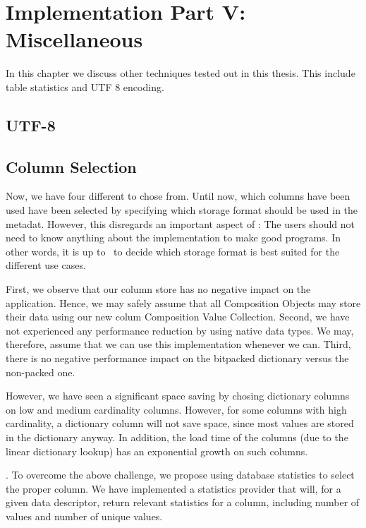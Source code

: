 \chapter{Implementation Part V: Miscellaneous}
\label{chp:misc}
In this chapter we discuss other techniques tested out in this thesis. This include table statistics and UTF 8 encoding.

\section{UTF-8}
\label{sec:UTF-8}


\section{Column Selection}
\label{sec:Column Selection}
Now, we have four different  to chose from. Until now, which columns have been used have been selected by specifying which storage format should be used in the metadat. However, this disregards an important aspect of \mdd: The users should not need to know anything about the implementation to make good programs. In other words, it is up to \gap~to decide which storage format is best suited for the different use cases.

First, we observe that our column store has no negative impact on the application. Hence, we may safely assume that all Composition Objects may store their data using our new colum Composition Value Collection. Second, we have not experienced any performance reduction by using native data types. We may, therefore, assume that we can use this implementation whenever we can. Third, there is no negative performance impact on the bitpacked dictionary versus the non-packed one.

However, we have seen a significant space saving by chosing dictionary columns on low and medium cardinality columns. However, for some columns with high cardinality, a dictionary column will not save space, since most values are stored in the dictionary anyway. In addition, the load time of the columns (due to the linear dictionary lookup) has an exponential growth on such columns.

.
To overcome the above challenge, we propose using database statistics to select the proper column. We have implemented a statistics provider that will, for a given data descriptor, return relevant statistics for a column, including number of values and number of unique values.

